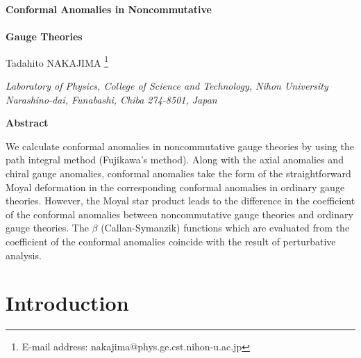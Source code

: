\documentclass[a4paper,12pt]{article}
\begin{document}
%
\renewcommand{\theequation}
{\thesection.\arabic{equation}}
%
\thispagestyle{empty}
\vspace*{20mm} 
%
\begin{center}
{\LARGE {\bf Conformal Anomalies in Noncommutative}} \\
 \qquad \\
{\LARGE {\bf Gauge Theories}} \\


\vspace*{20mm}

\renewcommand{\thefootnote}{\fnsymbol{footnote}}

{\Large Tadahito NAKAJIMA 
\footnote[1]{E-mail address: nakajima@phys.ge.cst.nihon-u.ac.jp}} \\
%
%
\vspace*{20mm}


{\large {\it Laboratory of Physics, College of Science and Technology, 
Nihon University}} \\
{\large {\it Narashino-dai, Funabashi, Chiba 274-8501, Japan}} \\ 

\vspace*{20mm}

{\bf Abstract} \\

\end{center}


We calculate conformal anomalies in noncommutative gauge theories by using the 
path integral method (Fujikawa's method). Along with the axial anomalies and 
chiral gauge anomalies, conformal anomalies take the form of the 
straightforward Moyal deformation in the corresponding conformal anomalies in 
ordinary gauge theories. However, the Moyal star product leads to the 
difference in the coefficient of the conformal anomalies between 
noncommutative gauge theories and ordinary gauge theories. 
The $\beta$ (Callan-Symanzik) functions which are evaluated from the 
coefficient of the conformal anomalies coincide with the result of 
perturbative analysis. 


\vspace*{15mm}


\clearpage
%

%
%
\section{Introduction}
\setcounter{page}{1}
\setcounter{equation}{0}
\end{document}
